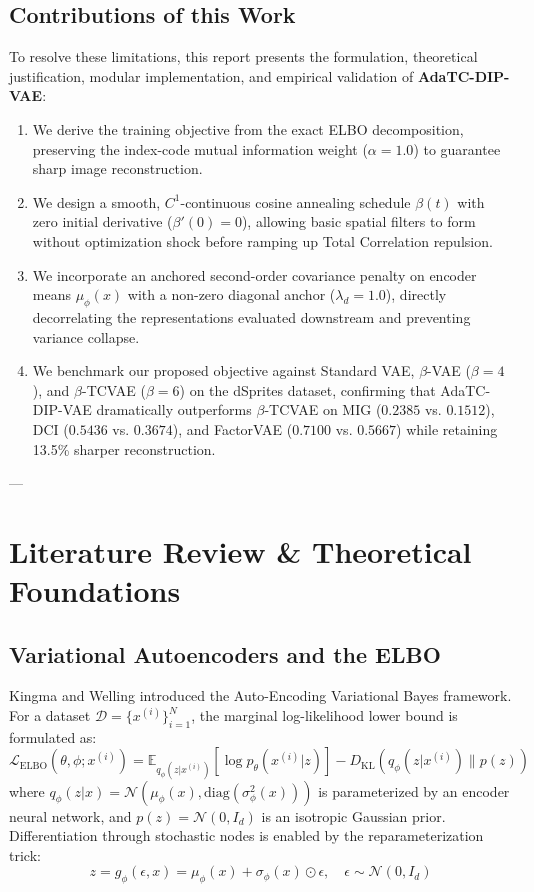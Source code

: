\documentclass[10pt,journal,compsoc]{IEEEtran}
\begin{document}
\subsection{Contributions of this Work}
To resolve these limitations, this report presents the formulation, theoretical justification, modular implementation, and empirical validation of \textbf{AdaTC-DIP-VAE}:
\begin{enumerate}
    \item We derive the training objective from the exact ELBO decomposition, preserving the index-code mutual information weight ($\alpha = 1.0$) to guarantee sharp image reconstruction.
    \item We design a smooth, $C^1$-continuous cosine annealing schedule $\beta(t)$ with zero initial derivative ($\beta'(0) = 0$), allowing basic spatial filters to form without optimization shock before ramping up Total Correlation repulsion.
    \item We incorporate an anchored second-order covariance penalty on encoder means $\mu_\phi(x)$ with a non-zero diagonal anchor ($\lambda_d = 1.0$), directly decorrelating the representations evaluated downstream and preventing variance collapse.
    \item We benchmark our proposed objective against Standard VAE, $\beta$-VAE ($\beta=4$), and $\beta$-TCVAE ($\beta=6$) on the dSprites dataset, confirming that AdaTC-DIP-VAE dramatically outperforms $\beta$-TCVAE on MIG ($0.2385$ vs. $0.1512$), DCI ($0.5436$ vs. $0.3674$), and FactorVAE ($0.7100$ vs. $0.5667$) while retaining 13.5\% sharper reconstruction.
\end{enumerate}

---

\section{Literature Review \& Theoretical Foundations}

\subsection{Variational Autoencoders and the ELBO}
Kingma and Welling \cite{kingma2013auto} introduced the Auto-Encoding Variational Bayes framework. For a dataset $\mathcal{D} = \{x^{(i)}\}_{i=1}^N$, the marginal log-likelihood lower bound is formulated as:
\begin{equation}
\mathcal{L}_{\text{ELBO}}(\theta, \phi; x^{(i)}) = \mathbb{E}_{q_\phi(z|x^{(i)})}[\log p_\theta(x^{(i)}|z)] - D_{\text{KL}}(q_\phi(z|x^{(i)}) \parallel p(z))
\label{eq:elbo}
\end{equation}
where $q_\phi(z|x) = \mathcal{N}(\mu_\phi(x), \text{diag}(\sigma_\phi^2(x)))$ is parameterized by an encoder neural network, and $p(z) = \mathcal{N}(0, I_d)$ is an isotropic Gaussian prior. Differentiation through stochastic nodes is enabled by the reparameterization trick:
\begin{equation}
z = g_\phi(\epsilon, x) = \mu_\phi(x) + \sigma_\phi(x) \odot \epsilon, \quad \epsilon \sim \mathcal{N}(0, I_d)
\label{eq:reparam}
\end{equation}
\end{document}
